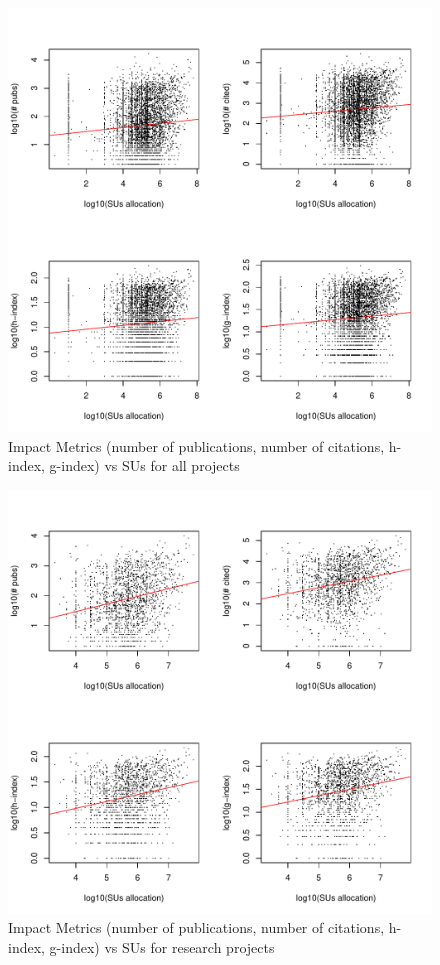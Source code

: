 \documentclass{sig-alternate}
\begin{document}
\begin{figure}[!htb] 
  \centering 
    \includegraphics[width=1.0\columnwidth]{images/02_metrics_vs_alloc_proj.pdf} 
  \caption{Impact Metrics (number of publications, number of citations, h-index, g-index) vs SUs for all projects}\label{F:metrics-vs-alloc-proj} 
\end{figure} 
 
\begin{figure}[!htb] 
  \centering 
    \includegraphics[width=1.0\columnwidth]{images/02_metrics_vs_alloc_research_proj.pdf} 
  \caption{Impact Metrics (number of publications, number of citations, h-index, g-index) vs SUs for research projects}\label{F:metrics-vs-alloc-research-proj} 
\end{figure} 
 
\end{document}
